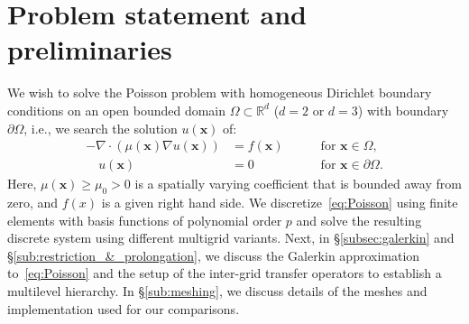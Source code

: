 \documentclass[times]{nlaauth}
\newcommand{\bs}[1]{\ensuremath{\boldsymbol #1}}
\begin{document}





\section{Problem statement and preliminaries}
\label{sec:problem}

We wish to solve the Poisson problem with
homogeneous Dirichlet boundary conditions on an open bounded domain
$\Omega\subset\mathbb R^d$ ($d=2$ or $d=3$) with boundary $\partial
\Omega$, i.e., we search the solution $u(\bs x)$ of:
\begin{equation}\label{eq:Poisson}
  \begin{aligned}
    -\nabla\cdot\left(\mu(\bs x)\nabla u(\bs x)\right) &= f(\bs x) \quad &&\text{ for } \bs x\in \Omega,\\
    \quad u(\bs x)& = 0  \quad &&\text{ for } \bs x\in \partial\Omega.
  \end{aligned}
\end{equation}
Here, $\mu(\bs x)\ge \mu_0>0$ is a spatially varying coefficient that
is bounded away from zero, and $f(x)$ is a given right hand side. We
discretize~\eqref{eq:Poisson} using finite elements with basis
functions of polynomial order $p$ and solve the resulting discrete
system using different multigrid variants. Next, in
\S\ref{subsec:galerkin} and \S\ref{sub:restriction_&_prolongation}, we
discuss the Galerkin approximation to~\eqref{eq:Poisson} and the setup
of the inter-grid transfer operators to establish a multilevel
hierarchy. In \S\ref{sub:meshing}, we discuss details of the meshes
and implementation used for our comparisons.
\end{document}
